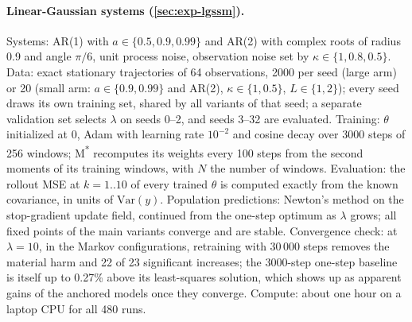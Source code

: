 \paragraph{Linear-Gaussian systems (\cref{sec:exp-lgssm}).}
Systems: AR(1) with $a \in \{0.5, 0.9, 0.99\}$ and AR(2) with complex roots of radius 0.9 and angle $\pi/6$, unit process noise, observation noise set by $\kappa \in \{1, 0.8, 0.5\}$. Data: exact stationary trajectories of 64 observations, 2000 per seed (large arm) or 20 (small arm: $a \in \{0.9, 0.99\}$ and AR(2), $\kappa \in \{1, 0.5\}$, $L \in \{1, 2\}$); every seed draws its own training set, shared by all variants of that seed; a separate validation set selects $\lambda$ on seeds 0--2, and seeds 3--32 are evaluated. Training: $\theta$ initialized at 0, Adam with learning rate $10^{-2}$ and cosine decay over 3000 steps of 256 windows; M\textsuperscript{*} recomputes its weights every 100 steps from the second moments of its training windows, with $N$ the number of windows. Evaluation: the rollout MSE at $k = 1..10$ of every trained $\theta$ is computed exactly from the known covariance, in units of $\mathrm{Var}(y)$. Population predictions: Newton's method on the stop-gradient update field, continued from the one-step optimum as $\lambda$ grows; all fixed points of the main variants converge and are stable. Convergence check: at $\lambda = 10$, in the Markov configurations, retraining with 30\,000 steps removes the material harm and 22 of 23 significant increases; the 3000-step one-step baseline is itself up to 0.27\% above its least-squares solution, which shows up as apparent gains of the anchored models once they converge. Compute: about one hour on a laptop CPU for all 480 runs.
